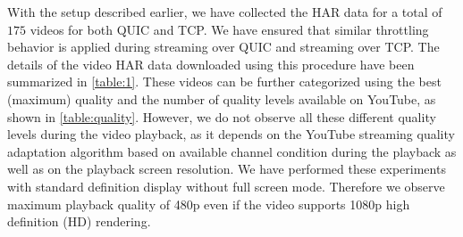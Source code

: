 With the setup described earlier, we have collected the HAR data for a total of $175$ videos for both QUIC and TCP. We have ensured that similar throttling behavior is applied during streaming over QUIC and streaming over TCP. The details of the video HAR data downloaded using this procedure have been summarized in \tbl\ref{table:1}. These videos can be further categorized using the best (maximum) quality and the number of quality levels available on YouTube, as shown in \tbl\ref{table:quality}. However, we do not observe all these different quality levels during the video playback, as it depends on the YouTube streaming quality adaptation algorithm based on available channel condition during the playback as well as on the playback screen resolution. We have performed these experiments with standard definition display without full screen mode. Therefore we observe maximum playback quality of 480p even if the video supports 1080p high definition (HD) rendering. 




